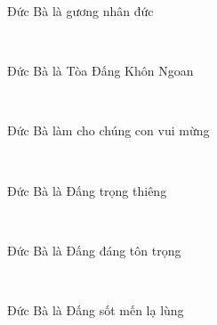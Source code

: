 \documentclass[12pt]{article}
\begin{document}
\begin{paracol}{2}
\begin{rightcolumn}
Đức Bà là gương nhân đức\\
\end{rightcolumn}

\begin{leftcolumn*}
\Large{\ \ \ }\\
\end{leftcolumn*}

\begin{rightcolumn}
Đức Bà là Tòa Đấng Khôn Ngoan\\
\end{rightcolumn}

\begin{leftcolumn*}
\Large{\ \ \ }\\
\end{leftcolumn*}

\begin{rightcolumn}
Đức Bà làm cho chúng con vui mừng\\
\end{rightcolumn}

\begin{leftcolumn*}
\Large{\ \ \ }\\
\end{leftcolumn*}

\begin{rightcolumn}
Đức Bà là Đấng trọng thiêng\\
\end{rightcolumn}

\begin{leftcolumn*}
\Large{\ \ \ }\\
\end{leftcolumn*}

\begin{rightcolumn}
Đức Bà là Đấng đáng tôn trọng\\
\end{rightcolumn}

\begin{leftcolumn*}
\Large{\ \ \ }\\
\end{leftcolumn*}

\begin{rightcolumn}
Đức Bà là Đấng sốt mến lạ lùng\\
\end{rightcolumn}


\end{paracol}
\end{document}
